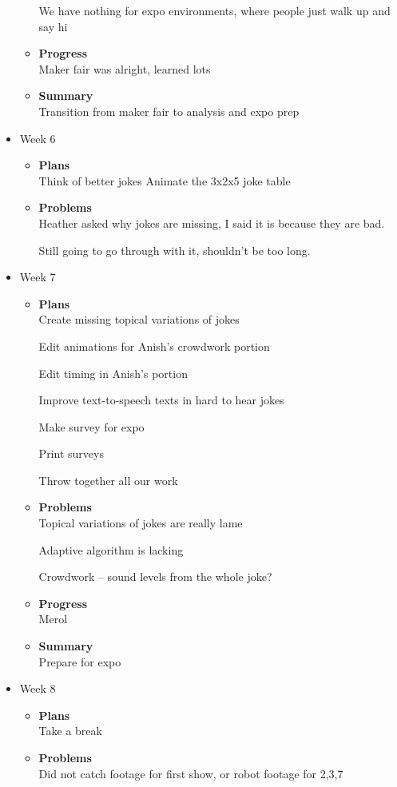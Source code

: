 \begin{itemize}
\begin{itemize}
We have nothing for expo environments, where people just walk up and say hi
			\item \textbf{Progress} \\
			Maker fair was alright, learned lots
			\item \textbf{Summary} \\
			Transition from maker fair to analysis and expo prep
		\end{itemize}
		\item{Week 6}
		\begin{itemize}
			\item \textbf{Plans} \\
			Think of better jokes
			Animate the 3x2x5 joke table
			\item \textbf{Problems} \\
			Heather asked why jokes are missing, I said it is because they are bad.

Still going to go through with it, shouldn't be too long.

		\end{itemize}
		\item{Week 7}
		\begin{itemize}
			\item \textbf{Plans} \\
			Create missing topical variations of jokes

Edit animations for Anish's crowdwork portion

Edit timing in Anish's portion

Improve text-to-speech texts in hard to hear jokes

Make survey for expo

Print surveys

Throw together all our work
			\item \textbf{Problems} \\
			Topical variations of jokes are really lame

Adaptive algorithm is lacking

Crowdwork – sound levels from the whole joke?

			\item \textbf{Progress} \\
			Merol
			\item \textbf{Summary} \\
			Prepare for expo
		\end{itemize}
		\item{Week 8}
		\begin{itemize}
			\item \textbf{Plans} \\
			Take a break
			\item \textbf{Problems} \\
			Did not catch footage for first show, or robot footage for 2,3,7


\end{itemize}
\end{itemize}
